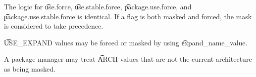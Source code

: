 The logic for \t{use.force}, \t{use.stable.force}, \t{package.use.force}, and
\t{package.use.\allowbreak stable.force} is identical. If a flag is both masked and forced, the
mask is considered to take precedence.

\t{USE_EXPAND} values may be forced or masked by using \t{expand_name_value}.

A package manager may treat \t{ARCH} values that are not the current architecture as being masked.




